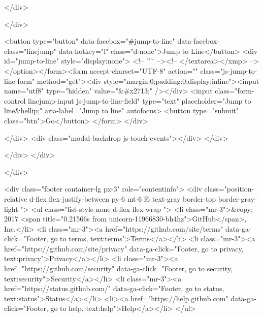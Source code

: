   </div>

  </div>

  <button type="button" data-facebox="#jump-to-line" data-facebox-class="linejump" data-hotkey="l" class="d-none">Jump to Line</button>
  <div id="jump-to-line" style="display:none">
    <!-- '"` --><!-- </textarea></xmp> --></option></form><form accept-charset="UTF-8" action="" class="js-jump-to-line-form" method="get"><div style="margin:0;padding:0;display:inline"><input name="utf8" type="hidden" value="&#x2713;" /></div>
      <input class="form-control linejump-input js-jump-to-line-field" type="text" placeholder="Jump to line&hellip;" aria-label="Jump to line" autofocus>
      <button type="submit" class="btn">Go</button>
</form>  </div>

  </div>
  <div class="modal-backdrop js-touch-events"></div>
</div>

    </div>
  </div>

  </div>

      
<div class="footer container-lg px-3" role="contentinfo">
  <div class="position-relative d-flex flex-justify-between py-6 mt-6 f6 text-gray border-top border-gray-light ">
    <ul class="list-style-none d-flex flex-wrap ">
      <li class="mr-3">&copy; 2017 <span title="0.21566s from unicorn-11966830-bh4hz">GitHub</span>, Inc.</li>
        <li class="mr-3"><a href="https://github.com/site/terms" data-ga-click="Footer, go to terms, text:terms">Terms</a></li>
        <li class="mr-3"><a href="https://github.com/site/privacy" data-ga-click="Footer, go to privacy, text:privacy">Privacy</a></li>
        <li class="mr-3"><a href="https://github.com/security" data-ga-click="Footer, go to security, text:security">Security</a></li>
        <li class="mr-3"><a href="https://status.github.com/" data-ga-click="Footer, go to status, text:status">Status</a></li>
        <li><a href="https://help.github.com" data-ga-click="Footer, go to help, text:help">Help</a></li>
    </ul>

